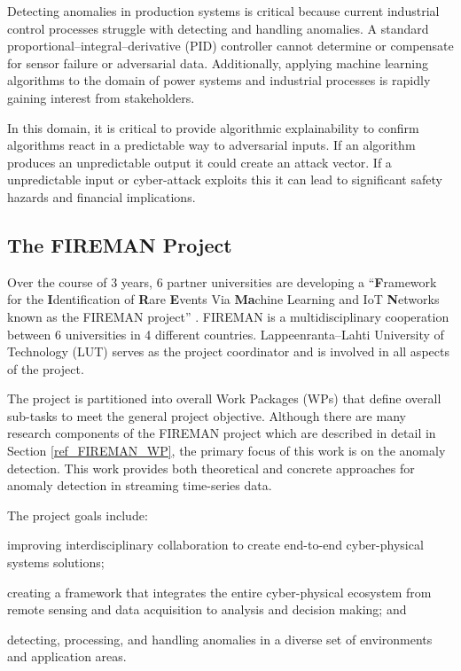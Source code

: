 Detecting anomalies in production systems is critical because current industrial control processes struggle with detecting and handling anomalies. A standard proportional–integral–derivative (PID) controller cannot determine or compensate for sensor failure or adversarial data. Additionally, applying machine learning algorithms to the domain of power systems and industrial processes is rapidly gaining interest from stakeholders.

In this domain, it is critical to provide algorithmic explainability to confirm algorithms react in a predictable way to adversarial inputs. If an algorithm produces an unpredictable output it could create an attack vector. If a unpredictable input or cyber-attack exploits this it can lead to significant safety hazards and financial implications.

\subsection{The FIREMAN Project}

Over the course of 3 years, 6 partner universities are developing a \enquote{\textbf{F}ramework for the \textbf{I}dentification of \textbf{R}are \textbf{E}vents Via \textbf{Ma}chine Learning and IoT \textbf{N}etworks known as the FIREMAN project} \parencite{fireman-homepage}. FIREMAN is a multidisciplinary cooperation between 6 universities in 4 different countries. Lappeenranta--Lahti University of Technology (LUT) serves as the project coordinator and is involved in all aspects of the project.

The project is partitioned into overall Work Packages (WPs) that define overall sub-tasks to meet the general project objective.
Although there are many research components of the FIREMAN project which are described in detail in Section \ref{ref_FIREMAN_WP}, the primary focus of this work is on the anomaly detection. This work provides both theoretical and concrete approaches for anomaly detection in streaming time-series data.

The project goals include:
\begin{inlinelist}
    \item improving interdisciplinary collaboration to create end-to-end cyber-physical systems solutions;
    \item creating a framework that integrates the entire cyber-physical ecosystem from remote sensing and data acquisition to analysis and decision making; and
    \item detecting, processing, and handling anomalies in a diverse set of environments and application areas.
\end{inlinelist}

